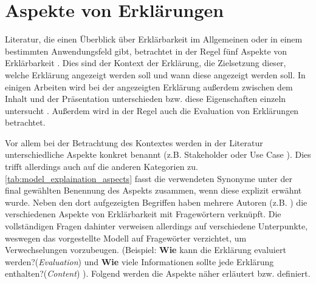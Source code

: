 \section{Aspekte von Erklärungen}
\label{sec:model_explanation_aspects}

Literatur, die einen Überblick über Erklärbarkeit im Allgemeinen oder in einem bestimmten Anwendungsfeld gibt, betrachtet in der Regel fünf Aspekte von Erklärbarkeit \cite{rosenfeld_explainability_2019, nunes_systematic_2017,chazette_knowledge_nodate}. Dies sind der Kontext der Erklärung, die Zielsetzung dieser, welche Erklärung angezeigt werden soll und wann diese angezeigt werden soll. In einigen Arbeiten wird bei der angezeigten Erklärung außerdem zwischen dem Inhalt und der Präsentation unterschieden bzw. diese Eigenschaften einzeln untersucht \cite{nunes_systematic_2017,abdulrahman_belief-based_2019}. Außerdem wird in der Regel auch die Evaluation von Erklärungen betrachtet.

Vor allem bei der Betrachtung des Kontextes werden in der Literatur unterschiedliche Aspekte konkret benannt (z.B. \glqq Stakeholder\grqq{} \cite{rosenfeld_explainability_2019} oder \glqq Use Case\grqq{} \cite{waa_evaluating_2021}). Dies trifft allerdings auch auf die anderen Kategorien zu. \autoref{tab:model_explaination_aspects} fasst die verwendeten Synonyme unter der final gewählten Benennung des Aspekts zusammen, wenn diese explizit erwähnt wurde. Neben den dort aufgezeigten Begriffen haben mehrere Autoren (z.B. \cite{rosenfeld_explainability_2019, chazette2020explainability}) die verschiedenen Aspekte von Erklärbarkeit mit Fragewörtern verknüpft. Die vollständigen Fragen dahinter verweisen allerdings auf verschiedene Unterpunkte, weswegen das vorgestellte Modell auf Fragewörter verzichtet, um Verwechselungen vorzubeugen. (Beispiel: \glqq \textbf{Wie} kann die Erklärung evaluiert werden?\grqq (\textit{Evaluation})\cite[vgl.][]{rosenfeld_explainability_2019} und \glqq \textbf{Wie} viele Informationen sollte jede Erklärung enthalten?\grqq (\textit{Content}) \cite[vgl.][]{kouki_user_2017}). Folgend werden die Aspekte näher erläutert bzw. definiert.

